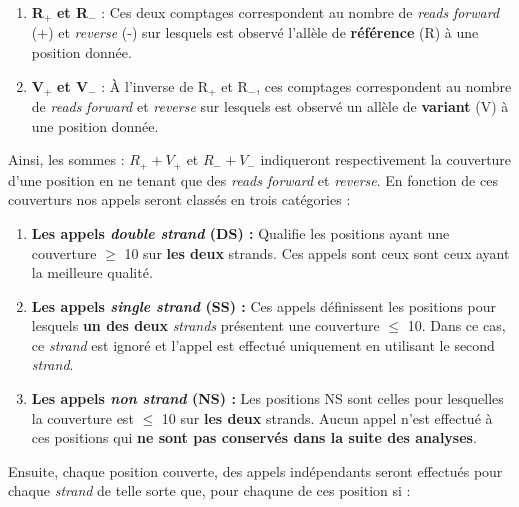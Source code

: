\documentclass[12pt,twoside]{reedthesis}
\providecommand{\tightlist}{%
  \setlength{\itemsep}{0pt}\setlength{\parskip}{0pt}}
\theoremstyle{definition}
\theoremstyle{definition}
\theoremstyle{remark}
\begin{document}
  \begin{enumerate}
  \def\labelenumi{\arabic{enumi}.}
  \tightlist
  \item
    \textbf{R}\(_+\) \textbf{et R}\(_-\) : Ces deux comptages
    correspondent au nombre de \emph{reads} \emph{forward} (+) et
    \emph{reverse} (-) sur lesquels est observé l'allèle de
    \textbf{référence} (R) à une position donnée.\\
  \item
    \textbf{V}\(_+\) \textbf{et V}\(_-\) : À l'inverse de R\(_+\) et
    R\(_-\), ces comptages correspondent au nombre de \emph{reads}
    \emph{forward} et \emph{reverse} sur lesquels est observé un allèle de
    \textbf{variant} (V) à une position donnée.
  \end{enumerate}
  
  Ainsi, les sommes : \(R_+ + V_+\) et \(R_- + V_-\) indiqueront
  respectivement la couverture d'une position en ne tenant que des
  \emph{reads forward} et \emph{reverse}. En fonction de ces couverturs
  nos appels seront classés en trois catégories :
  
  \begin{enumerate}
  \def\labelenumi{\arabic{enumi}.}
  \tightlist
  \item
    \textbf{Les appels \emph{double strand} (DS) :} Qualifie les positions
    ayant une couverture \(\ge\) 10 sur \textbf{les deux} strands. Ces
    appels sont ceux sont ceux ayant la meilleure qualité.\\
  \item
    \textbf{Les appels \emph{single strand} (SS) :} Ces appels définissent
    les positions pour lesquels \textbf{un des deux} \emph{strands}
    présentent une couverture \(\le\) 10. Dans ce cas, ce \emph{strand}
    est ignoré et l'appel est effectué uniquement en utilisant le second
    \emph{strand}.\\
  \item
    \textbf{Les appels \emph{non strand} (NS) :} Les positions NS sont
    celles pour lesquelles la couverture est \(\le\) 10 sur \textbf{les
    deux} strands. Aucun appel n'est effectué à ces positions qui
    \textbf{ne sont pas conservés dans la suite des analyses}.
  \end{enumerate}
  
  Ensuite, chaque position couverte, des appels indépendants seront
  effectués pour chaque \emph{strand} de telle sorte que, pour chaqune de
  ces position si :
  
\end{document}
